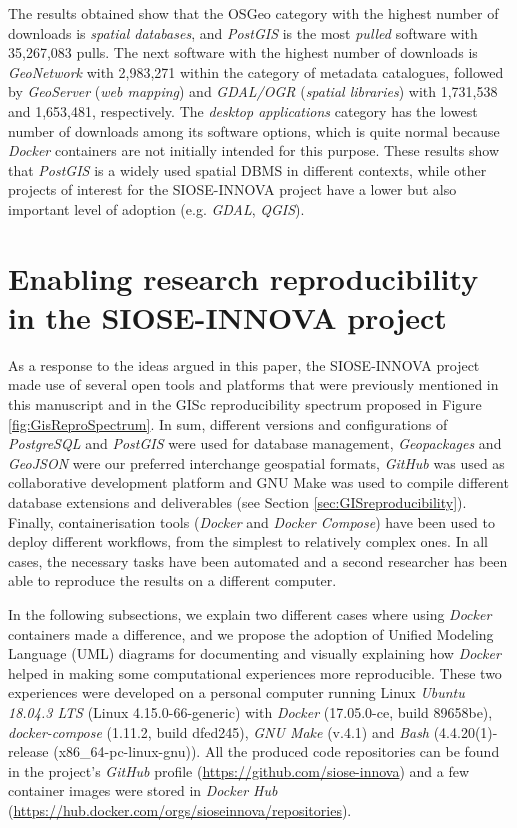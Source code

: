 \documentclass[ijgi,article,submit,moreauthors,pdftex]{Definitions/mdpi}
\begin{document}
The results obtained show that the OSGeo category with the highest number of downloads is \textit{spatial databases}, and \textit{PostGIS} is the most \textit{pulled} software with 35,267,083 pulls. The next software with the highest number of downloads is \textit{GeoNetwork} with 2,983,271 within the category of metadata catalogues, followed by \textit{GeoServer} (\textit{web mapping}) and \textit{GDAL/OGR} (\textit{spatial libraries}) with 1,731,538 and 1,653,481, respectively. The \textit{desktop applications} category has the lowest number of downloads among its software options, which is quite normal because \textit{Docker} containers are not initially intended for this purpose. These results show that \textit{PostGIS} is a widely used spatial DBMS in different contexts, while other projects of interest for the SIOSE-INNOVA project have a lower but also important level of adoption (e.g. \textit{GDAL}, \textit{QGIS}).


\section{Enabling research reproducibility in the SIOSE-INNOVA project}
\label{sec:projects}

As a response to the ideas argued in this paper, the SIOSE-INNOVA project made use of several open tools and platforms that were previously mentioned in this manuscript and in the GISc reproducibility spectrum proposed in Figure \ref{fig:GisReproSpectrum}. In sum, different versions and configurations of \textit{PostgreSQL} and \textit{PostGIS} were used for database management, \textit{Geopackages} and \textit{GeoJSON} were our preferred interchange geospatial formats, \textit{GitHub} was used as collaborative development platform and GNU Make was used to compile different database extensions and deliverables (see Section \ref{sec:GISreproducibility}). Finally, containerisation tools (\textit{Docker} and \textit{Docker Compose}) have been used to deploy different workflows, from the simplest to relatively complex ones. In all cases, the necessary tasks have been automated and a second researcher has been able to reproduce the results on a different computer. 

In the following subsections, we explain two different cases where using \textit{Docker} containers made a difference, and we propose the adoption of Unified Modeling Language (UML) diagrams for documenting and visually explaining how \textit{Docker} helped in making some computational experiences more reproducible. These two experiences were developed on a personal computer running Linux \textit{Ubuntu 18.04.3 LTS} (Linux 4.15.0-66-generic) with \textit{Docker} (17.05.0-ce, build 89658be), \textit{docker-compose} (1.11.2, build dfed245), \textit{GNU Make} (v.4.1) and \textit{Bash} (4.4.20(1)-release (x86\_64-pc-linux-gnu)). All the produced code repositories can be found in the project's \textit{GitHub} profile (\url{https://github.com/siose-innova}) and a few container images were stored in \textit{Docker Hub} (\url{https://hub.docker.com/orgs/sioseinnova/repositories}).
\end{document}
